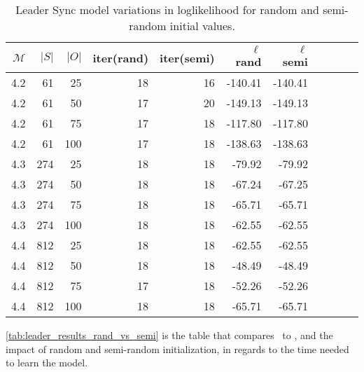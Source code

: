 \begin{table}[htb!]
    \centering
    \caption{Leader Sync model variations in loglikelihood for random and semi-random initial values.}
    \label{tab:leader_results_loglikelihood}
    \begin{tabular}{rrrrrrrrrrr}
        \toprule
        $\mathcal{M}$ & $|S|$ & $|O|$ & iter(rand) & iter(semi) & $\ell$ rand & $\ell$ semi \\
        \midrule
        4.2           & 61    & 25    & 18         & 16         & -140.41     & -140.41     \\
        4.2           & 61    & 50    & 17         & 20         & -149.13     & -149.13     \\
        4.2           & 61    & 75    & 17         & 18         & -117.80     & -117.80     \\
        4.2           & 61    & 100   & 17         & 18         & -138.63     & -138.63     \\
        4.3           & 274   & 25    & 18         & 18         & -79.92      & -79.92      \\
        4.3           & 274   & 50    & 18         & 18         & -67.24      & -67.25      \\
        4.3           & 274   & 75    & 18         & 18         & -65.71      & -65.71      \\
        4.3           & 274   & 100   & 18         & 18         & -62.55      & -62.55      \\
        4.4           & 812   & 25    & 18         & 18         & -62.55      & -62.55      \\
        4.4           & 812   & 50    & 18         & 18         & -48.49      & -48.49      \\
        4.4           & 812   & 75    & 17         & 18         & -52.26      & -52.26      \\
        4.4           & 812   & 100   & 18         & 18         & -65.71      & -65.71      \\
        \bottomrule
    \end{tabular}
\end{table}

\autoref{tab:leader_results_rand_vs_semi} is the table that compares \Cupaal\ to \Jajapy, and the impact of random and semi-random initialization, in regards to the time needed to learn the model.





